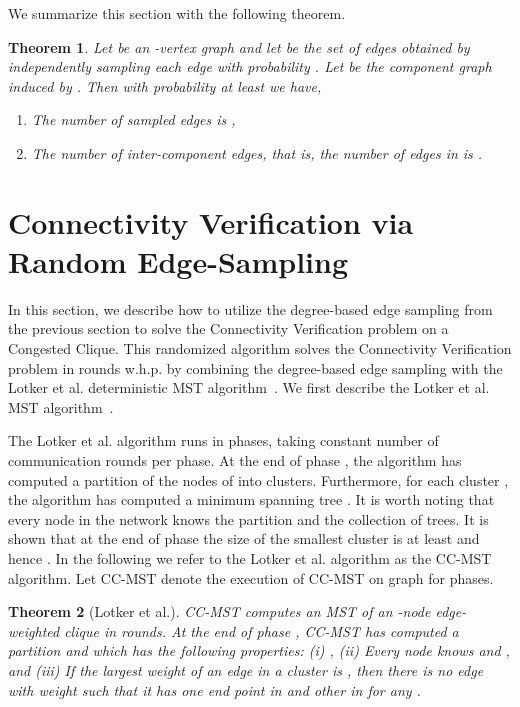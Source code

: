 \documentclass[11pt]{article}
\newtheorem{theorem}{Theorem}
\begin{document}
\noindent We summarize this section with the following theorem.  
\begin{theorem}\label{thm:sample}
  Let  be an -vertex graph  and let  be the set of edges obtained by independently sampling each edge  with probability . 
  Let  be the component graph induced by . 
  Then with probability at least  we have, 
  \begin{enumerate}
    \item The number of sampled edges is , 
    \item The number of inter-component edges, that is, the number of edges in  is .
  \end{enumerate}
\end{theorem}

\section{Connectivity Verification via Random Edge-Sampling} \label{sec:conver}
In this section, we describe how to utilize the degree-based edge sampling from the previous section to solve the Connectivity Verification problem on a Congested Clique.
This randomized algorithm solves the Connectivity Verification problem in  rounds w.h.p. by combining the degree-based edge sampling with the Lotker et al. deterministic MST algorithm~\cite{lotker2005mstJournal}. 
We first describe the  Lotker et al. MST algorithm~\cite{lotker2005mstJournal}.

The Lotker et al. algorithm runs in phases, taking constant number of communication rounds per phase.
At the end of phase , the algorithm has computed a partition  of the nodes of  into clusters.
Furthermore, for each cluster , the algorithm has computed a minimum spanning tree . 
It is worth noting that every node in the network knows the partition  and the collection  of trees.
It is shown that at the end of phase  the size of the smallest cluster is at least  and hence . 
In the following we refer to the Lotker et al. algorithm as the \textsc{CC-MST} algorithm. 
Let \textsc{CC-MST} denote the execution of \textsc{CC-MST} on graph  for  phases. 
\begin{theorem}[Lotker et al.\cite{lotker2005mstJournal}]\label{thm:lotker}
  \textsc{CC-MST} computes an MST of an -node edge-weighted clique in  rounds. 
  At the end of phase , \textsc{CC-MST} has computed a partition  and  which has the following properties: 
  (i) , 
  (ii) Every node knows  and , and
  (iii) If the largest weight of an edge in a cluster  is , then there is no edge with weight  such that it has one end point in  and other in  for any . 
\end{theorem}
\end{document}
